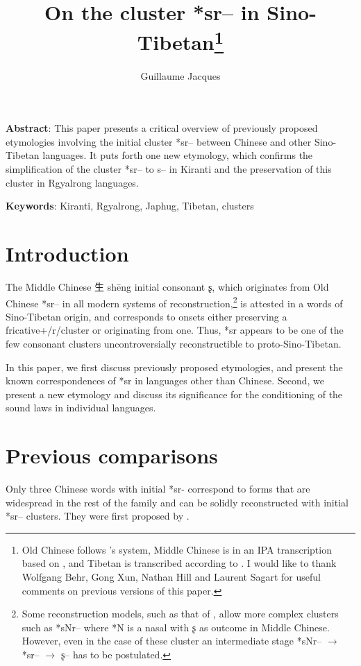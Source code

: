 \documentclass[oldfontcommands,oneside,a4paper,11pt]{article}
\newcommand{\ipa}[1]{{\phon #1}} %
\newcommand{\zh}[1]{{\cn #1}}
\begin{document}
 


\title{On the cluster *sr-- in Sino-Tibetan\footnote{Old Chinese follows \citealt{bs14oc}'s system, Middle Chinese is in an IPA transcription based on \citet{baxter92}, and Tibetan is transcribed according to \citet{jacques12transcription}. I would like to thank  Wolfgang Behr, Gong Xun, Nathan Hill and Laurent Sagart for useful comments on previous versions of this paper.}  
}
\author{Guillaume Jacques}
\maketitle


\textbf{Abstract}: This paper presents a critical overview of previously proposed etymologies involving the initial cluster *\ipa{sr--} between Chinese and other Sino-Tibetan languages. It puts forth one new etymology, which confirms the simplification of the cluster *\ipa{sr--} to \ipa{s--} in Kiranti and the preservation of this cluster in Rgyalrong languages.


\textbf{Keywords}: Kiranti, Rgyalrong, Japhug, Tibetan, clusters


\section{Introduction}

The Middle Chinese \zh{生} shēng initial consonant \ipa{ʂ}, which originates from Old Chinese *\ipa{sr--} in all modern systems of reconstruction,\footnote{Some reconstruction models, such as that of \citet{bs14oc}, allow more complex clusters such as *\ipa{sNr--} where *N is a nasal with \ipa{ʂ} as outcome in Middle Chinese. However, even in the case of these cluster an intermediate stage *\ipa{sNr--} $\rightarrow$ *\ipa{sr--} $\rightarrow$  \ipa{ʂ--} has to be postulated.} is attested in a words of Sino-Tibetan origin, and corresponds to onsets either preserving a fricative+/r/cluster or originating from one. Thus, *\ipa{sr} appears to be  one of the few consonant clusters uncontroversially reconstructible to proto-Sino-Tibetan. 

In this paper, we first discuss previously proposed etymologies, and present the known correspondences of *\ipa{sr} in languages other than Chinese. Second, we present a new etymology and discuss its significance for the conditioning of the sound laws in individual languages.

\section{Previous comparisons} \label{sec:previous}
Only three Chinese words with initial *\ipa{sr-} correspond to forms that are widespread in the rest of the family and can be solidly reconstructed with initial *\ipa{sr--} clusters.  They were first proposed by \citet{benedict72}.
\end{document}
